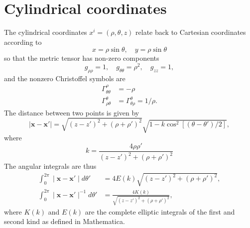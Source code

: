 \documentclass[preprint]{revtex4}
\begin{document}
\newpage
\appendix




\section{Cylindrical coordinates}
The cylindrical coordinates $x^i=(\rho,\theta,z)$ relate back to Cartesian coordinates according to
\begin{equation}
x=\rho\sin\theta, \quad y=\rho\sin\theta
\end{equation}
so that the metric tensor has non-zero components
\begin{equation}
g_{\rho\rho}=1,\quad g_{\theta\theta}=\rho^2,\quad g_{zz}=1,
\end{equation}
and the nonzero Christoffel symbols are
\begin{align}
\Gamma^{\rho}_{\theta\theta}&=-\rho\\
\Gamma^{\theta}_{\rho\theta}&=\Gamma^{\theta}_{\theta\rho}=1/\rho.
\end{align}
The distance between two points is given by
\begin{equation}
\mid \bm{x}-\bm{x}'\mid=\sqrt{(z-z')^2+(\rho+\rho')^2}\sqrt{1-k\cos^2[(\theta-\theta')/2]},
\end{equation}
where
\begin{equation}
k=\frac{4\rho\rho'}{(z-z')^2+(\rho+\rho')^2}
\end{equation}
The angular integrals are thus
\begin{align}
\int_0^{2\pi}\mid \bm{x}-\bm{x}'\mid d\theta'&=4E(k)\sqrt{(z-z')^2+(\rho+\rho')^2},\\
\int_0^{2\pi}\mid \bm{x}-\bm{x}'\mid^{-1} d\theta'&=\frac{4K(k)}{\sqrt{(z-z')^2+(\rho+\rho')^2}},
\end{align}
where $K(k)$ and $E(k)$ are the complete elliptic integrals of the first and second kind as defined in Mathematica.
\end{document}
